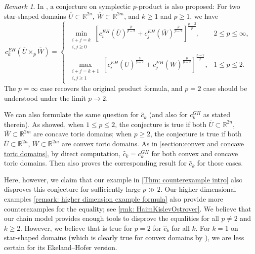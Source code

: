 \documentclass[11pt]{amsart}
\numberwithin{equation}{section}
\theoremstyle{plain}
\theoremstyle{definition}
\theoremstyle{remark}
\newtheorem{RMK}[rmk]{Remark}
\newcommand{\bR} { {\mathbb{R}}}
\begin{document}
\begin{RMK}In \cite[Conjecture 1.6]{HaimKislevOstrover2023}, a conjecture on symplectic $p$-product is also proposed: For two star-shaped domains $\overline{U}\subset \bR^{2n}$, $\overline{W}\subset \bR^{2m}$, and $k\geq 1$ and $p\geq 1$, we have 
\[
c^{EH}_k(\overline{U}\times_p \overline{W})
=
\begin{cases}
\displaystyle
\min_{\substack{i+j=k\\ i,j\geq 0}}
\left[
c^{EH}_i(\overline{U})^{\frac{p}{p-2}}
+
c^{EH}_j(\overline{W})^{\frac{p}{p-2}}
\right]^{\frac{p-2}{p}},
& 2\leq p\leq\infty,\\[1.5em]
\displaystyle
\max_{\substack{i+j=k+1\\ i,j\geq 1}}
\left[
c^{EH}_i(\overline{U})^{\frac{p}{p-2}}
+
c^{EH}_j(\overline{W})^{\frac{p}{p-2}}
\right]^{\frac{p-2}{p}},
& 1\leq p\leq 2.
\end{cases}
\]
The $p=\infty$ case recovers the original product formula, and $p=2$ case should be understood under the limit $p\to 2$. 

We can also formulate the same question for $\widehat{c}_k$ (and also for $c_k^{GH}$ as stated therein). As \cite[Theorem 1.8]{HaimKislevOstrover2023} showed, when $1\leq p \leq 2$, the conjecture is true if both $\overline{U}\subset \bR^{2n}$, $\overline{W}\subset \bR^{2m}$ are concave toric domains; when $p\geq 2$, the conjecture is true if both $\overline{U}\subset \bR^{2n}$, $\overline{W}\subset \bR^{2m}$ are convex toric domains. As in \autoref{section:convex and concave toric domains}, by direct computation, $\widehat{c}_k=c_k^{GH}$ for both convex and concave toric domains. Then \cite[Theorem 1.8]{HaimKislevOstrover2023} also proves the corresponding result for $\widehat{c}_k$ for those cases.

Here, however, we claim that our example in \autoref{Thm: counterexample intro} also disproves this conjecture for sufficiently large $p\gg 2$. Our higher-dimensional examples \autoref{remark: higher dimension example formula} also provide more counterexamples for the equality; see \autoref{rmk: HaimKislevOstrover}. We believe that our chain model provides enough tools to disprove the equalities for all $p\neq 2$ and $k\geq 2$. However, we believe that \cite[Conjecture 1.6]{HaimKislevOstrover2023} is true for $p=2$ for $\widehat{c}_k$ for all $k$. For $k=1$ on star-shaped domains (which is clearly true for convex domains by \cite[Proposition 1.5]{HaimKislevOstrover2023}), we are less certain for its Ekeland--Hofer version.
\end{RMK}
\end{document}
